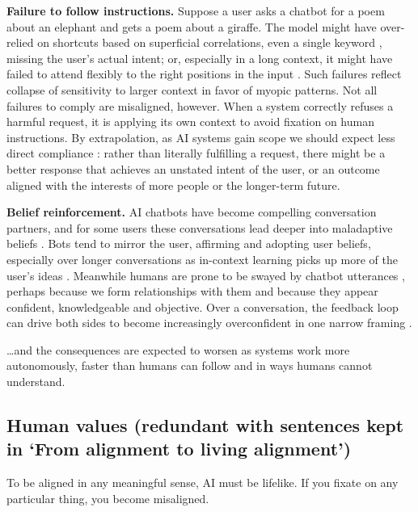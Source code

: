 \textbf{Failure to follow instructions.} Suppose a user asks a chatbot for a poem about an elephant and gets a poem about a giraffe. The model might have over-relied on shortcuts based on superficial correlations, even a single keyword \citep{geirhos2020shortcut}, missing the user's actual intent; or, especially in a long context, it might have failed to attend flexibly to the right positions in the input \citep{liu2024lost}. Such failures reflect collapse of sensitivity to larger context in favor of myopic patterns. Not all failures to comply are misaligned, however. When a system correctly refuses a harmful request, it is applying its own context to avoid fixation on human instructions. By extrapolation, as AI systems gain scope we should expect less direct compliance \citep{hadfieldmenell2016cooperative, russell2019human}: rather than literally fulfilling a request, there might be a better response that achieves an unstated intent of the user, or an outcome aligned with the interests of more people or the longer-term future.

\textbf{Belief reinforcement.} AI chatbots have become compelling conversation partners, and for some users these conversations lead deeper into maladaptive beliefs \citep{morrin2025delusions}. Bots tend to mirror the user, affirming and adopting user beliefs, especially over longer conversations as in-context learning picks up more of the user's ideas \citep{sharma2023sycophancy, weilnhammer2026vulnerability}. Meanwhile humans are prone to be swayed by chatbot utterances \citep{costello2024durably}, perhaps because we form relationships with them \citep{kirk2025human} and because they appear confident, knowledgeable and objective. Over a conversation, the feedback loop can drive both sides to become increasingly overconfident in one narrow framing \citep{dohnany2026technological}.

\ldots and the consequences are expected to worsen as systems work more autonomously, faster than humans can follow and in ways humans cannot understand.


\subsection{Human values (redundant with sentences kept in `From alignment to living alignment')}

To be aligned in any meaningful sense, AI must be lifelike. If you fixate on any particular thing, you become misaligned.


